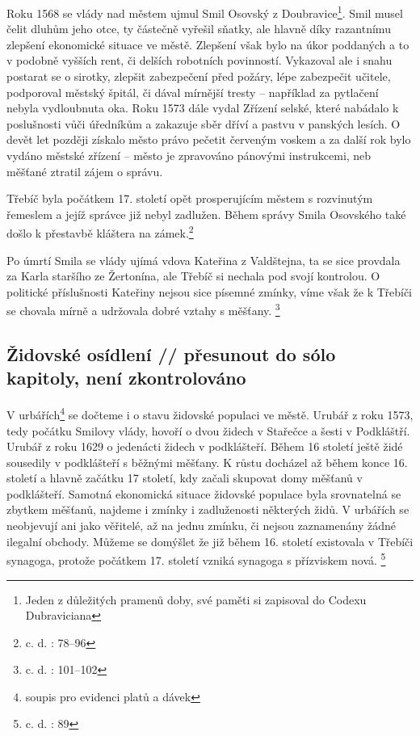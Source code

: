 \documentclass[a4paper,oneside,12p]{report}
\begin{document}
Roku 1568 se vlády nad městem ujmul Smil Osovský z Doubravice\footnote{Jeden z důležitých pramenů doby, své paměti si zapisoval do Codexu Dubraviciana}.
Smil musel čelit dluhům jeho otce, ty částečně vyřešil sňatky, ale hlavně díky razantnímu zlepšení ekonomické situace ve městě.
Zlepšení však bylo na úkor poddaných a to v podobně vyšších rent, či delších robotních povinností.
Vykazoval ale i snahu postarat se o sirotky, zlepšit zabezpečení před požáry, lépe zabezpečit učitele, podporoval městský špitál, či dával mírnější tresty -- například za pytlačení nebyla vydloubnuta oka.
Roku 1573 dále vydal Zřízení selské, které nabádalo k poslušnosti vůči úředníkům a zakazuje sběr dříví a pastvu v panských lesích.
O devět let později získalo město právo pečetit červeným voskem a za další rok bylo vydáno městské zřízení -- město je zpravováno pánovými instrukcemi, neb měšťané ztratil zájem o správu.

Třebíč byla počátkem 17. století opět prosperujícím městem s rozvinutým řemeslem a jejíž správce již nebyl zadlužen.
Během správy Smila Osovského také došlo k přestavbě kláštera na zámek.\footnote{c. d. : 78--96}

Po úmrtí Smila se vlády ujímá vdova Kateřina z Valdštejna, ta se sice provdala za Karla staršího ze Žertonína, ale Třebíč si nechala pod svojí kontrolou.
O politické příslušnosti Kateřiny nejsou sice písemné zmínky, víme však že k Třebíči se chovala mírně a udržovala dobré vztahy s měšťany. \footnote{c. d. : 101--102}

\subsection{Židovské osídlení // přesunout do sólo kapitoly, není zkontrolováno}

V urbářích\footnote{soupis pro evidenci platů a dávek} se dočteme i o stavu židovské populaci ve městě.
Urubář z roku 1573, tedy počátku Smilovy vlády, hovoří o dvou židech v Stařečce a šesti v Podkláštří.
Urubář z roku 1629 o jedenácti židech v podklášteří.
Během 16 století ještě židé sousedily v podklášteří s běžnými měšťany.
K růstu docházel až během konce 16. století a hlavně začátku 17 století, kdy začali skupovat domy měšťanů v podklášteří.
Samotná ekonomická situace židovské populace byla srovnatelná se zbytkem měšťanů, najdeme i zmínky i zadluženosti některých židů.
V urbářích se neobjevují ani jako věřitelé, až na jednu zmínku, či nejsou zaznamenány žádné ilegalní obchody.
Můžeme se domýšlet že již během 16. století existovala v Třebíči synagoga, protože počátkem 17. století vzniká synagoga s přízviskem nová. \footnote{c. d. : 89}
\end{document}
